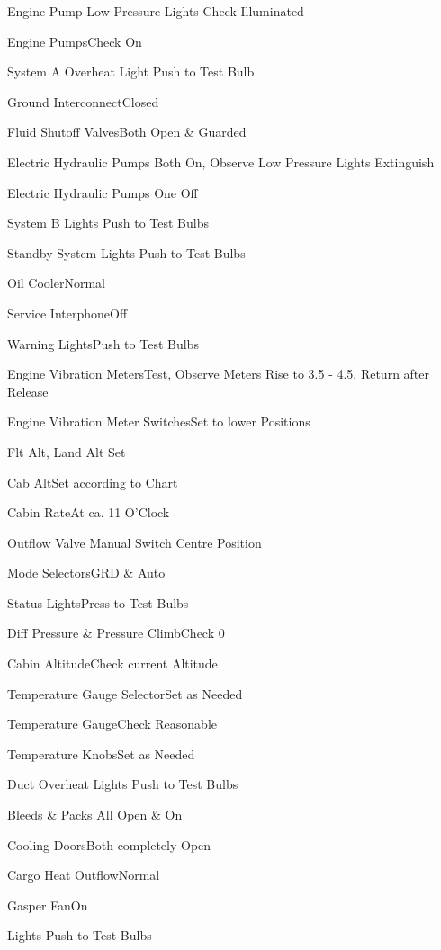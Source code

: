 \documentclass[sim-use]{checklist}
\begin{document}
\begin{continuedchecklist}
     {
        \item{Engine Pump Low Pressure Lights} {Check Illuminated}
        \item{Engine Pumps}{Check On}
        \item{System A Overheat Light} {Push to Test Bulb}
        \item{Ground Interconnect}{Closed}
        \item{Fluid Shutoff Valves}{Both Open \& Guarded}
        \item{Electric Hydraulic Pumps} {Both On, Observe Low Pressure Lights Extinguish}
        \item{Electric Hydraulic Pumps} {One Off}
        \item{System B Lights} {Push to Test Bulbs}
        \item{Standby System Lights} {Push to Test Bulbs}
    }
    \item{Oil Cooler}{Normal}
    \item{Service Interphone}{Off}
    \item{Warning Lights}{Push to Test Bulbs}
    \item{Engine Vibration Meters}{Test, Observe Meters Rise to 3.5 - 4.5, Return after Release}
    \item{Engine Vibration Meter Switches}{Set to lower Positions}
     {
        \item{Flt Alt, Land Alt} {Set}
        \item{Cab Alt}{Set according to Chart}
        \item{Cabin Rate}{At ca. 11 O'Clock}
        \item{Outflow Valve Manual Switch} {Centre Position}
        \item{Mode Selectors}{GRD \& Auto}
        \item{Status Lights}{Press to Test Bulbs}
    }
    \item{Diff Pressure \& Pressure Climb}{Check 0}
    \item{Cabin Altitude}{Check current Altitude}
    \item{Temperature Gauge Selector}{Set as Needed}
    \item{Temperature Gauge}{Check Reasonable}
    \item{Temperature Knobs}{Set as Needed}
    \item{Duct Overheat Lights} {Push to Test Bulbs}
     {
        \item{Bleeds \& Packs} {All Open \& On}
        \item{Cooling Doors}{Both completely Open}
        \item{Cargo Heat Outflow}{Normal}
        \item{Gasper Fan}{On}
        \item{Lights} {Push to Test Bulbs}
    }
\end{continuedchecklist}
\end{document}
